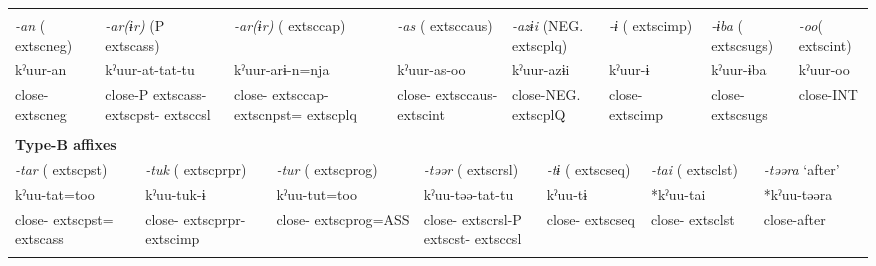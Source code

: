 \tabletail{}
\tablelasttail{}
\begin{tabularx}{\textwidth}{XXXXXXXXXXXXXXXXXXXXXXX}
\lsptoprule
\multicolumn{23}{X}{{\bfseries Type-A affixes}}\\
{ \textit{{}-an} (	extsc{neg})} & \multicolumn{6}{X}{{ \textit{{}-ar(ɨr)} (P	extsc{ass})}} & \multicolumn{4}{X}{{ \textit{{}-ar(ɨr)} (	extsc{cap})}} & \multicolumn{4}{X}{{ \textit{{}-as} (	extsc{caus})}} & \multicolumn{3}{X}{{ \textit{{}-azɨi} (NEG.	extsc{plq})}} & \multicolumn{2}{X}{{ \textit{{}-ɨ} (	extsc{imp})}} & \multicolumn{2}{X}{{ \textit{{}-ɨba} (	extsc{sugs})}} & { \textit{{}-oo}(	extsc{int})}\\
{ kˀuur-an} & \multicolumn{6}{X}{{ kˀuur-at-tat-tu}} & \multicolumn{4}{X}{{ kˀuur-arɨ-n=nja}} & \multicolumn{4}{X}{{ kˀuur-as-oo}} & \multicolumn{3}{X}{{ kˀuur-azɨi}} & \multicolumn{2}{X}{{ kˀuur-ɨ}} & \multicolumn{2}{X}{{ kˀuur-ɨba}} & { kˀuur-oo}\\
close-	extsc{neg} & \multicolumn{6}{X}{close-P	extsc{ass}-	extsc{pst}-	extsc{csl}} & \multicolumn{4}{X}{close-	extsc{cap}-	extsc{npst}=	extsc{plq}} & \multicolumn{4}{X}{close-	extsc{caus}-	extsc{int}} & \multicolumn{3}{X}{close-NEG.	extsc{pl}Q} & \multicolumn{2}{X}{close-	extsc{imp}} & \multicolumn{2}{X}{close-	extsc{sugs}} & close-INT\\
\multicolumn{23}{X}{}\\
\multicolumn{23}{X}{{\bfseries Type-B affixes}}\\
\multicolumn{3}{X}{{ \textit{{}-tar} (	extsc{pst})}} & \multicolumn{5}{X}{{ \textit{{}-tuk} (	extsc{prpr})}} & \multicolumn{4}{X}{{ \textit{{}-tur} (	extsc{prog})}} & \multicolumn{4}{X}{{ \textit{{}-təər} (	extsc{rsl})}} & \multicolumn{3}{X}{{ \textit{{}-tɨ} (	extsc{seq})}} & \multicolumn{2}{X}{{ \textit{{}-tai} (	extsc{lst})}} & \multicolumn{2}{X}{{ \textit{{}-təəra} ‘after’}}\\
\multicolumn{3}{X}{{ kˀuu-tat=too}} & \multicolumn{5}{X}{{ kˀuu-tuk-ɨ}} & \multicolumn{4}{X}{{ kˀuu-tut=too}} & \multicolumn{4}{X}{{ kˀuu-təə-tat-tu}} & \multicolumn{3}{X}{{ kˀuu-tɨ}} & \multicolumn{2}{X}{{ *kˀuu-tai}} & \multicolumn{2}{X}{{ *kˀuu-təəra}}\\
\multicolumn{3}{X}{close-	extsc{pst}=	extsc{ass}} & \multicolumn{5}{X}{close-	extsc{prpr}-	extsc{imp}} & \multicolumn{4}{X}{close-	extsc{prog}=ASS} & \multicolumn{4}{X}{close-	extsc{rsl}-P	extsc{st}-	extsc{csl}} & \multicolumn{3}{X}{close-	extsc{seq}} & \multicolumn{2}{X}{close-	extsc{lst}} & \multicolumn{2}{X}{{ close-after}}\\
\multicolumn{3}{X}{} & \multicolumn{5}{X}{} & \multicolumn{4}{X}{} & \multicolumn{4}{X}{} & \multicolumn{3}{X}{} & \multicolumn{2}{X}{} & \multicolumn{2}{X}{}\\

\end{tabularx}
